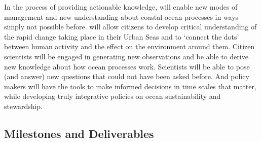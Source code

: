 \documentclass[12pt]{article}
\begin{document}

In the process of providing actionable knowledge, \pro will enable new
modes of management and new understanding about coastal ocean
processes in ways simply not possible before. \pro will allow citizens
to develop critical understanding of the rapid change taking place in
their Urban Seas and to ‘connect the dots’ between human activity and
the effect on the environment around them. Citizen scientists will be
engaged in generating new observations and be able to derive new
knowledge about how ocean processes work. Scientists will be able to
pose (and answer) new questions that could not have been asked
before. And policy makers will have the tools to make informed
decisions in time scales that matter, while developing truly
integrative policies on ocean sustainability and
stewardship. %



\subsection{Milestones and Deliverables}
\end{document}
